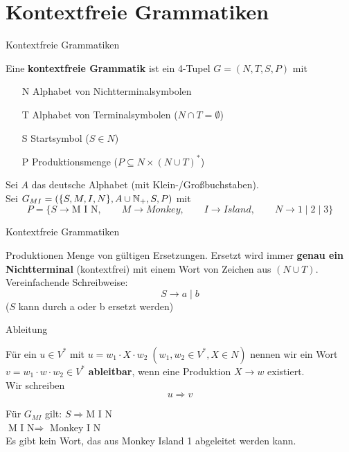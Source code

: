 \section{Kontextfreie Grammatiken}
\begin{frame}{Kontextfreie Grammatiken}
	
	\begin{Definition}
		Eine \textbf{kontextfreie Grammatik} ist ein 4-Tupel $G = (N, T, S ,P)$ mit
		\begin{itemize}
			\item[N] Alphabet von Nichtterminalsymbolen
			\item[T] Alphabet von Terminalsymbolen ($N \cap T = \emptyset$)
			\item[S] Startsymbol ($S \in N$)
			\item[P] Produktionsmenge ($P \subseteq N \times (N \cup T)^\ast$)
		\end{itemize}
	\end{Definition}

	\pause
	\begin{Beispiel}
		Sei $A$ das deutsche Alphabet (mit Klein-/Großbuchstaben).\\
		Sei $G_{MI} = (\{S, M, I, N\}, A \cup \mathbb{N}_+, S, P)$ mit
		\[
			P = \{S \to \text{M I N}, \qquad M \to Monkey, \qquad I \to Island, \qquad N \to 1 \mid 2 \mid 3 \}
		\]
	\end{Beispiel}
\end{frame}

\begin{frame}{Kontextfreie Grammatiken}
	\begin{block}{Produktionen}
		Menge von gültigen Ersetzungen. Ersetzt wird immer \textbf{genau ein Nichtterminal} (kontextfrei) mit einem Wort von Zeichen aus $(N \cup T)$.\\
		\pause
		Vereinfachende Schreibweise: $$S \to a \mid b$$ ($S$ kann durch a oder b ersetzt werden)
	\end{block}
\end{frame}

\begin{frame}{Ableitung}
	\begin{Definition}
		Für ein  $u \in V^\ast$ mit $u = w_1 \cdot X \cdot w_2 \; (w_1, w_2 \in V^\ast, X \in N)$ nennen wir ein Wort $v = w_1 \cdot w \cdot w_2 \in V^\ast$ \textbf{ableitbar}, wenn eine Produktion $X \to w$ existiert.\\
		Wir schreiben $$u \Rightarrow v$$
	\end{Definition}
	
	\pause
	\begin{Beispiel}
		Für $G_{MI}$ gilt: $S \Rightarrow \text{M I N}$\\
		$ \text{M I N} \Rightarrow$ Monkey I N\\
		Es gibt kein Wort, das aus Monkey Island 1 abgeleitet werden kann.
	\end{Beispiel}
	
\end{frame}

